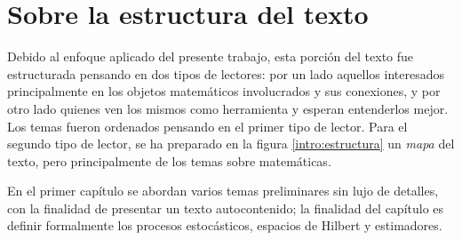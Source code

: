 
%
%
%
%


\section*{Sobre la estructura del texto}


Debido al enfoque aplicado del presente trabajo, esta porción del texto fue estructurada pensando en dos tipos de lectores: por un lado aquellos interesados principalmente en los objetos matemáticos involucrados y sus conexiones, y por otro lado quienes ven los mismos como herramienta y esperan entenderlos mejor.
%
Los temas fueron ordenados pensando en el primer tipo de lector.
%
Para el segundo tipo de lector, se ha preparado en la figura \ref{intro:estructura} un \textit{mapa} del texto, pero principalmente de los temas sobre matemáticas.

En el primer capítulo se abordan varios temas preliminares sin lujo de detalles, con la finalidad de presentar un texto autocontenido;
%
la finalidad del capítulo es definir formalmente los procesos estocásticos, espacios de Hilbert y estimadores.

